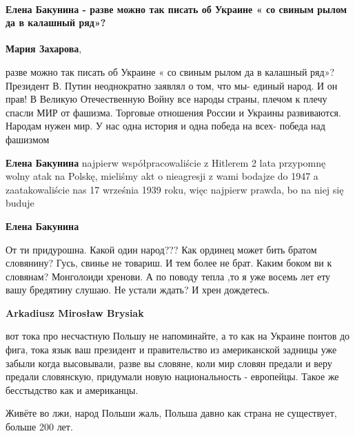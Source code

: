  
 
 
 
 
\paragraph{Елена Бакунина - разве можно так писать об Украине « со свиным рылом да в калашный ряд»?}

\begin{itemize} %
\textbf{Мария Захарова}, 

разве можно так писать об Украине « со свиным рылом да в калашный ряд»?
Президент В. Путин неоднократно заявлял о том, что мы- единый народ. И он прав!
В Великую Отечественную Войну все народы страны, плечом к плечу спасли МИР от
фашизма. Торговые отношения России и Украины развиваются. Народам нужен мир. У
нас одна история и одна победа на всех- победа над фашизмом

\begin{itemize} %
\textbf{Елена Бакунина} najpierw współpracowaliście z Hitlerem 2 lata przypomnę wolny atak na Polskę, mieliśmy akt o nieagresji z wami bodajze do 1947 a zaatakowaliście nas 17 września 1939 roku, więc najpierw prawda, bo na niej się buduje

\textbf{Елена Бакунина} 

От ти придурошна. Какой один народ??? Как ординец может
бить братом словянину? Гусь, свинье не товариш. И тем более не брат. Каким
боком ви к словянам? Монголоиди хренови. А по поводу тепла ,то я уже восемь лет
ету вашу бредятину слушаю. Не устали ждать? И хрен дождетесь.

\textbf{Arkadiusz Mirosław Brysiak} 

вот тока про несчастную Польшу не напоминайте, а то как на Украине понтов до
фига, тока язык ваш президент и правительство из американской задницы уже
забыли когда высовывали, разве вы словяне, коли мир словян предали и веру
предали словянскую, придумали новую национальность - европейцы. Такое же
бесстыдство как и американцы.

Живёте во лжи, народ Польши жаль, Польша давно как страна не существует, больше
200 лет.


\end{itemize}
\end{itemize}
